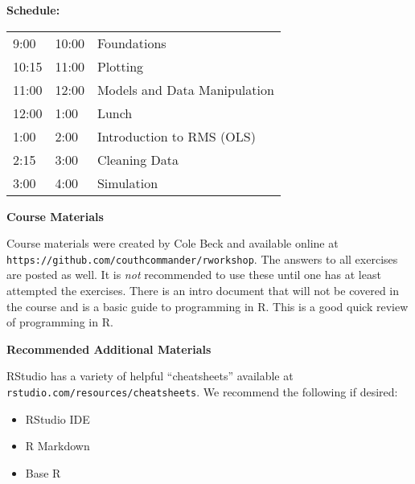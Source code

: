 \documentclass[twocolumn]{article}
\begin{document}
\vspace*{\fill}

\pagebreak

\begin{flushleft}

\vspace*{0.5cm}

\textbf{Schedule:}

\begin{tabular}[H]{lll}
9:00 & 10:00  & Foundations \\
10:15 & 11:00 & Plotting \\
11:00 & 12:00 & Models and Data Manipulation \\
12:00 & 1:00  & Lunch \\
1:00  & 2:00  & Introduction to RMS (OLS) \\
2:15  & 3:00  & Cleaning Data \\
3:00  & 4:00  & Simulation \\
\end{tabular}

\vspace*{\fill}

\textbf{Course Materials}

Course materials were created by Cole Beck and available online at
\texttt{https://github.com/couthcommander/rworkshop}. The answers to
all exercises are posted as well. It is \emph{not} recommended to use
these until one has at least attempted the exercises. There is an intro document that will not be covered in the course and is a basic guide to programming in R. This is a good quick review of programming in R.


\vspace*{\fill}

\textbf{Recommended Additional Materials}

RStudio has a variety of helpful ``cheatsheets'' available at \texttt{rstudio.com/resources/cheatsheets}. We recommend the following if desired:

\begin{itemize}
\item RStudio IDE
\item R Markdown
\item Base R
\end{itemize}

\vspace*{\fill}



\end{flushleft}
\end{document}
